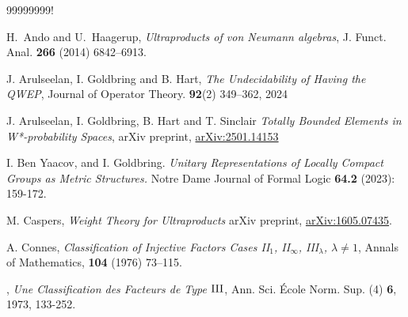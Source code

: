 \documentclass[12pt]{amsart}
\theoremstyle{definition}
\begin{document}
\begin{thebibliography}{99999999!}


 H.\ Ando and U.\ Haagerup, \emph{Ultraproducts of von Neumann algebras}, J. Funct. Anal. {\bf 266} (2014) 6842--6913.

  J. Arulseelan, I. Goldbring and B. Hart, \emph{The Undecidability of Having the QWEP}, Journal of Operator Theory. {\bf 92}(2) 349–362, 2024 

 J. Arulseelan, I. Goldbring, B. Hart and T. Sinclair \emph{Totally Bounded Elements in W*-probability Spaces}, arXiv preprint, \url{arXiv:2501.14153}

 I. Ben Yaacov, and I. Goldbring. \emph{Unitary Representations of Locally Compact Groups as Metric Structures.} Notre Dame Journal of Formal Logic {\bf 64.2} (2023): 159-172.






 M. Caspers, \emph{Weight Theory for Ultraproducts} arXiv preprint, \url{arXiv:1605.07435}.

 A. Connes, \emph{Classification of Injective Factors Cases II$_1$, II$_\infty$, III$_\lambda$, $\lambda\not=1$}, Annals of Mathematics, \textbf{104} (1976) 73--115.


 \bysame, \emph{Une Classification des Facteurs de Type ${\rm III}$}, Ann. Sci. \'Ecole Norm. Sup. (4) {\bf 6}, 1973, 133-252.


\end{thebibliography}
\end{document}
